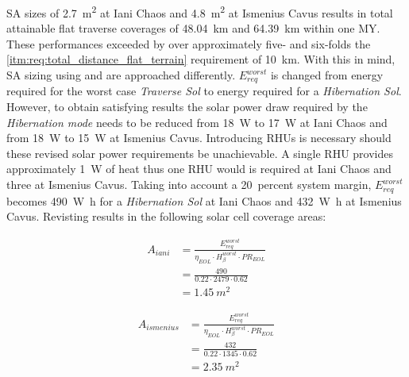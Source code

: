 \clearpage
\ac{SA} sizes of \SI{2.7}{m^{2}} at Iani Chaos and \SI{4.8}{m^{2}} at Ismenius Cavus results in total attainable flat traverse coverages of \SI{48.04}{\kilo\meter} and \SI{64.39}{\kilo\meter} within one \ac{MY}. These performances exceeded by over approximately five- and six-folds the \ref{itm:req:total_distance_flat_terrain} requirement of \SI{10}{\kilo\meter}. With this in mind, \ac{SA} sizing using  and  are approached differently. $E_{req}^{worst}$ is changed from energy required for the worst case \textit{Traverse Sol} to energy required for a \textit{Hibernation Sol}. However, to obtain satisfying results the solar power draw required by the \textit{Hibernation mode} needs to be reduced from \SI{18}{\watt} to \SI{17}{\watt} at Iani Chaos and from \SI{18}{\watt} to \SI{15}{\watt} at Ismenius Cavus. Introducing \acp{RHU} is necessary should these revised solar power requirements be unachievable. A single \ac{RHU} provides approximately \SI{1}{\watt} of heat thus one \ac{RHU} would is required at Iani Chaos and three at Ismenius Cavus. Taking into account a \SI{20}{percent} system margin, $E_{req}^{worst}$ becomes \SI{490}{\watt\hour} for a \textit{Hibernation Sol} at Iani Chaos and \SI{432}{\watt\hour} at Ismenius Cavus. Revisting  results in the following solar cell coverage areas:


\begin{align}
  \label{calc:solar_cell_area_iani_chaos_hibernation}
  A_{iani} &= \frac{E_{req}^{worst}}{\eta_{EOL} \cdot H_{\beta}^{worst} \cdot PR_{EOL}}\\
           &= \frac{490}{0.22 \cdot 2479 \cdot 0.62}\\
           &= \SI{1.45}{m^{2}}
\end{align}

\begin{align}
  \label{calc:solar_cell_area_ismenius_cavus_hibernation}
  A_{ismenius} &= \frac{E_{req}^{worst}}{\eta_{EOL} \cdot H_{\beta}^{worst} \cdot PR_{EOL}}\\
               &= \frac{432}{0.22 \cdot 1345 \cdot 0.62}\\
               &= \SI{2.35}{m^{2}}
\end{align}

